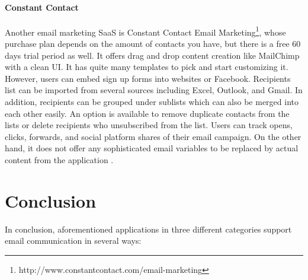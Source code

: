 \paragraph{Constant Contact}
Another email marketing \ac{SaaS} is Constant Contact Email Marketing\footnote{http://www.constantcontact.com/email-marketing}, whose purchase plan depends on the amount of contacts you have, but there is a free 60 days trial period as well. It offers drag and drop content creation like MailChimp with a clean \ac{UI}. It has quite many templates to pick and start customizing it. However, users can embed sign up forms into websites or Facebook. Recipients list can be imported from several sources including Excel, Outlook, and Gmail. In addition, recipients can be grouped under sublists which can also be merged into each other easily. An option is available to remove duplicate contacts from the lists or delete recipients who unsubscribed from the list. Users can track opens, clicks, forwards, and social platform shares of their email campaign. On the other hand, it does not offer any sophisticated email variables to be replaced by actual content from the application \citep{ConstantContactInc.2013,ConstantContactInc.2013a,ConstantContactInc.2011}. 

\clearpage

\section{Conclusion}
\label{sec:3.3:Conc}
In conclusion, aforementioned applications in three different categories support email communication in several ways:

